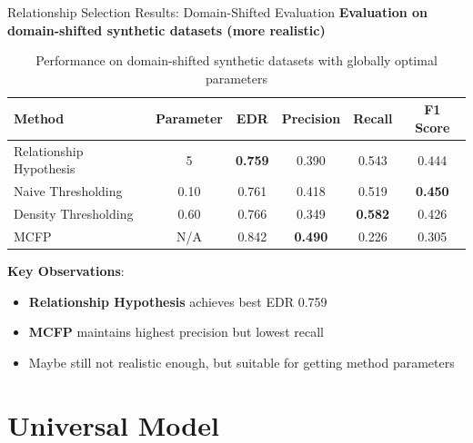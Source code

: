 \documentclass[aspectratio=169]{beamer}
\begin{document}
\begin{frame}{Relationship Selection Results: Domain-Shifted Evaluation}
    \textbf{Evaluation on domain-shifted synthetic datasets (more realistic)}

    \vspace{0.5em}

    \begin{table}[h]
        \centering
        \scriptsize
        \begin{tabular}{lccccc}
            \toprule
            \textbf{Method}         & \textbf{Parameter} & \textbf{EDR}   & \textbf{Precision} & \textbf{Recall} & \textbf{F1 Score} \\
            \midrule
            Relationship Hypothesis & 5                  & \textbf{0.759} & 0.390              & 0.543           & 0.444             \\
            Naive Thresholding      & 0.10               & 0.761          & 0.418              & 0.519           & \textbf{0.450}    \\
            Density Thresholding    & 0.60               & 0.766          & 0.349              & \textbf{0.582}  & 0.426             \\
            MCFP                    & N/A                & 0.842          & \textbf{0.490}     & 0.226           & 0.305             \\
            \bottomrule
        \end{tabular}
        \caption{Performance on domain-shifted synthetic datasets with globally optimal parameters}
    \end{table}

    \vspace{0.5em}

    \textbf{Key Observations}:
    \begin{itemize}
        \item \textbf{Relationship Hypothesis} achieves best EDR 0.759
        \item \textbf{MCFP} maintains highest precision but lowest recall
        \item Maybe still not realistic enough, but suitable for getting method parameters
    \end{itemize}
\end{frame}


\section{Universal Model}
\end{document}
